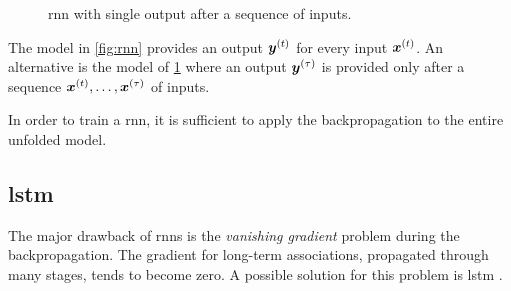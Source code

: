 \begin{figure}
  \centering
  \caption{\ac{rnn} with single output after a sequence of inputs.}
  \label{fig:rnnSO}
\end{figure}
The model in \cref{fig:rnn} provides an output $\bm{y}^{(t)}$ for every
input $\bm{x}^{(t)}$. An alternative is the model of
\cref{fig:rnnSO} where an output $\bm{y}^{(\tau)}$ is provided only
after a sequence $\bm{x}^{(t)},\dots,\bm{x}^{(\tau)}$ of inputs.

In order to train a \ac{rnn}, it is sufficient to apply the
backpropagation to the entire unfolded model.

\subsection{\acf{lstm}}
The major drawback of \acp{rnn} is the \emph{vanishing
  gradient} problem during the backpropagation. The gradient
for long-term associations, propagated through many stages, tends to
become zero. A possible solution for this problem is \ac{lstm} \cite{hochreiter_1997_lstm}.

